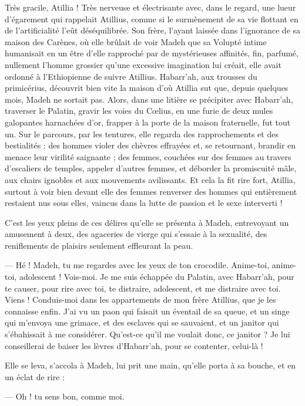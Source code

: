 \documentclass[a4paper, 11pt, oneside, polutonikogreek, french]{article}
\begin{document}
Très gracile, Atillia ! Très nerveuse et électrisante avec, dans le regard, une lueur d'égarement qui rappelait Atillius, comme si le surmènement de sa vie flottant en de l'artificialité l'eût déséquilibrée. Son frère, l'ayant laissée dans l'ignorance de sa maison des Carènes, où elle brûlait de voir Madeh que sa Volupté intime humanisait en un être d'elle rapproché par de mystérieuses affinités, fin, parfumé, nullement l'homme grossier qu'une excessive imagination lui créait, elle avait ordonné à l'Ethiopienne de suivre Atillius. Habarr'ah, aux trousses du primicérius, découvrit bien vite la maison d'où Atillia sut que, depuis quelques mois, Madeh ne sortait pas. Alors, dans une litière se précipiter avec Habarr'ah, traverser le Palatin, gravir les voies du Cœlius, en une furie de deux mules galopantes harnachées d'or, frapper à la porte de la maison fraternelle, fut tout un. Sur le parcours, par les tentures, elle regarda des rapprochements et des bestialités : des hommes violer des chèvres effrayées et, se retournant, brandir en menace leur virilité saignante ; des femmes, couchées sur des femmes au travers d'escaliers de temples, appeler d'autres femmes, et déborder la promiscuité mâle, aux chairs ignobles et aux mouvements avilissants. Et cela la fit rire fort, Atillia, surtout à voir bien devant elle des femmes renverser des hommes qui entièrement restaient nus sous elles, vaincus dans la lutte de passion et le sexe interverti !

C'est les yeux pleins de ces délires qu'elle se présenta à Madeh, entrevoyant un amusement à deux, des agaceries de vierge qui s'essaie à la sexualité, des reniflements de plaisirs seulement effleurant la peau.

--- Hé ! Madeh, tu me regardes avec les yeux de ton crocodile. Anime-toi, anime-toi, adolescent ! Vois-moi. Je me suis échappée du Palatin, avec Habarr'ah, pour te causer, pour rire avec toi, te distraire, adolescent, et me distraire avec toi. Viens ! Conduis-moi dans les appartements de mon frère Atillius, que je les connaisse enfin. J'ai vu un paon qui faisait un éventail de sa queue, et un singe qui m'envoya une grimace, et des esclaves qui se sauvaient, et un janitor qui s'ébahissait à me considérer. Qu'est-ce qu'il me voulait donc, ce janitor ? Je lui conseillerai de baiser les lèvres d'Habarr'ah, pour se contenter, celui-là !

Elle se leva, s'accola à Madeh, lui prit une main, qu'elle porta à sa bouche, et en un éclat de rire :

--- Oh ! tu sens bon, comme moi.
\end{document}
